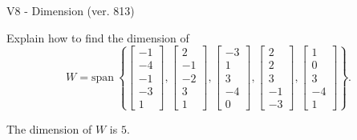 \begin{exercise}
  \begin{exerciseTitle}V8 - Dimension (ver. 813)\end{exerciseTitle}
  \begin{exerciseStatement}
    Explain how to find the dimension of 
\[W=\mathrm{span}\ \left\{\left[\begin{array}{r}
-1 \\
-4 \\
-1 \\
-3 \\
1
\end{array}\right] , \left[\begin{array}{r}
2 \\
-1 \\
-2 \\
3 \\
1
\end{array}\right] , \left[\begin{array}{r}
-3 \\
1 \\
3 \\
-4 \\
0
\end{array}\right] , \left[\begin{array}{r}
2 \\
2 \\
3 \\
-1 \\
-3
\end{array}\right] , \left[\begin{array}{r}
1 \\
0 \\
3 \\
-4 \\
1
\end{array}\right]\right\}.\]



  \end{exerciseStatement}
  \begin{exerciseAnswer}
   The dimension of \(W\) is  \(5\).
  


  \end{exerciseAnswer}
\end{exercise}